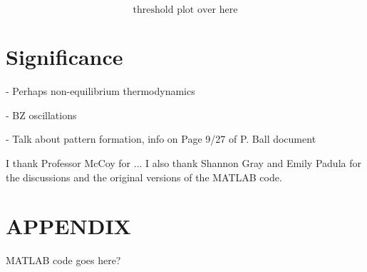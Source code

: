 \documentclass[twocolumn,amsmath,amssymb,aps]{revtex4}
\begin{document}
\begin{equation}
\text{threshold plot over here}
\end{equation}







\section{Significance}

- Perhaps non-equilibrium thermodynamics

- BZ oscillations

- Talk about pattern formation, info on Page 9/27 of P. Ball document


\begin{acknowledgments}
I thank Professor McCoy for ... I also thank Shannon Gray and Emily Padula for the discussions and the original versions of the MATLAB code.  
\end{acknowledgments}


\appendix

\section{APPENDIX}

MATLAB code goes here?



\end{document}
